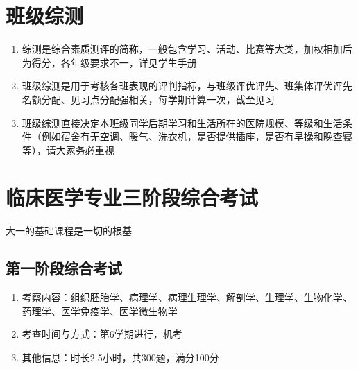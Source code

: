 \section[班级综测]{班级综测}
\label{class_evaluation}
\begin{enumerate}
    \item 综测是综合素质测评的简称，一般包含学习、活动、比赛等大类，加权相加后为得分，各年级要求不一，详见学生手册
    \item 班级综测是用于考核各班表现的评判指标，与班级评优评先、班集体评优评先名额分配、见习点分配\footnotemark 强相关，每学期计算一次，截至见习
    \item 班级综测直接决定本班级同学后期学习和生活所在的医院规模、等级和生活条件（例如宿舍有无空调、暖气、洗衣机，是否提供插座，是否有早操和晚查寝\footnotemark 等），请大家务必重视
\end{enumerate}

\section[临床医学专业三阶段综合考试]{临床医学专业三阶段综合考试}
大一的基础课程是一切的根基

\subsection[第一阶段综合考试]{第一阶段综合考试}
\begin{enumerate}
    \item 考察内容：组织胚胎学、病理学、病理生理学、解剖学、生理学、生物化学、药理学、医学免疫学、医学微生物学
    \item 考查时间与方式：第6学期进行，机考
    \item 其他信息：时长2.5小时，共300题，满分100分
\end{enumerate}

